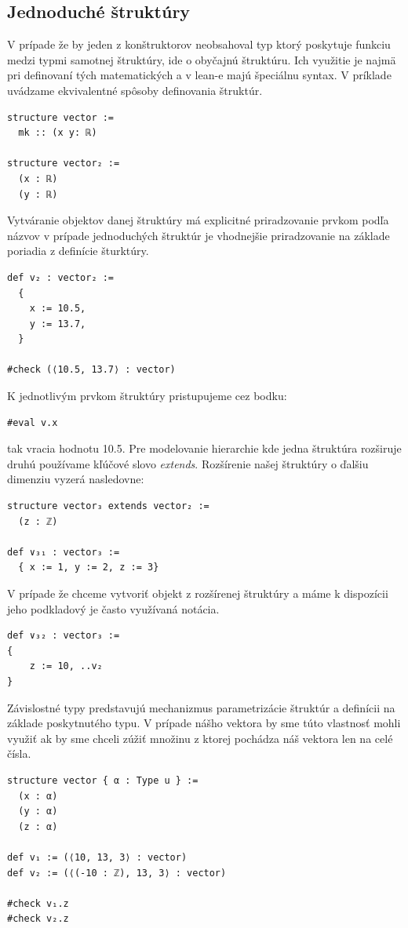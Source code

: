 \documentclass[a4paper,10pt,oneside]{report}%
\begin{document}
\subsection{Jednoduché štruktúry}
    V prípade že by jeden z konštruktorov neobsahoval typ ktorý poskytuje funkciu
medzi typmi samotnej štruktúry, ide o obyčajnú štruktúru.
    Ich využitie je najmä pri definovaní tých matematických a v lean-e majú
špeciálnu syntax.
    V príklade uvádzame ekvivalentné spôsoby definovania štruktúr.
\begin{lstlisting}
structure vector :=
  mk :: (x y: ℝ)

structure vector₂ :=
  (x : ℝ)
  (y : ℝ)
\end{lstlisting}
    Vytváranie objektov danej štruktúry má explicitné priradzovanie prvkom
podľa názvov v prípade jednoduchých štruktúr je vhodnejšie priradzovanie na
základe poriadia z definície šturktúry.
\begin{lstlisting}
def v₂ : vector₂ :=
  {
    x := 10.5,
    y := 13.7,
  }

#check (⟨10.5, 13.7⟩ : vector)
\end{lstlisting}
    K jednotlivým prvkom štruktúry pristupujeme cez bodku:
\begin{lstlisting}
#eval v.x
\end{lstlisting}
    tak vracia hodnotu 10.5.
    Pre modelovanie hierarchie kde jedna štruktúra rozširuje druhú používame
kľúčové slovo \emph{extends}.
    Rozšírenie našej štruktúry o ďalšiu dimenziu vyzerá nasledovne:
\begin{lstlisting}
structure vector₃ extends vector₂ :=
  (z : ℤ)

def ∨₃₁ : vector₃ :=
  { x := 1, y := 2, z := 3}
\end{lstlisting}
    V prípade že chceme vytvoriť objekt z rozšírenej štruktúry a máme k dispozícii
jeho podkladový je často využívaná notácia.
\begin{lstlisting}
def ∨₃₂ : vector₃ :=
{
    z := 10, ..v₂
}
\end{lstlisting}
    Závislostné typy predstavujú mechanizmus parametrizácie štruktúr a definícii
na základe poskytnutého typu.
    V prípade nášho vektora by sme túto vlastnosť mohli využiť ak by sme chceli
zúžiť množinu z ktorej pochádza náš vektora len na celé čísla.
\begin{lstlisting}
structure vector { α : Type u } :=
  (x : α)
  (y : α)
  (z : α)

def v₁ := (⟨10, 13, 3⟩ : vector)
def v₂ := (⟨(-10 : ℤ), 13, 3⟩ : vector)

#check v₁.z
#check v₂.z
\end{lstlisting}
\end{document}
